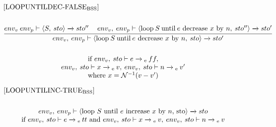 \begin{equation}
\begin{split}
\begin{minipage}{\linewidth}
$[\text{LOOPUNTILDEC-FALSE}_\text{BSS}]$
\end{minipage}
\\\\
\begin{minipage}{\linewidth}
\centering
$\cfrac{env_v \: env_p \vdash \langle S, \: sto \rangle \xrightarrow{} sto'' \quad\: env_v, \: env_p \vdash \langle \text{loop} \: S \: \text{until} \: e \text{ decrease } x \text{ by } n, \: sto'' \rangle \xrightarrow{} sto'}{env_v, \: env_p \vdash \langle \text{loop} \: S \: \text{until} \: e \text{ decrease } x \text{ by } n, \: sto \rangle \xrightarrow{} sto'}$ 
\end{minipage}
\\\\
\begin{minipage}{\linewidth}
\centering
if $env_v, \: sto \vdash e \xrightarrow{}\textsubscript{e} \: ff,$ \\
$env_v, \: sto \vdash x \xrightarrow{}\textsubscript{e} \: v, \: env_v, \: sto \vdash n \xrightarrow{}\textsubscript{e} \: v'$ 
\\ where $x = \mathcal{N}^{-1}(v-v')$
\end{minipage}
\end{split}
\end{equation}


\begin{equation}
\begin{split}
\begin{minipage}{\linewidth}
$[\text{LOOPUNTILINC-TRUE}_\text{BSS}]$
\end{minipage}
\\\\
\begin{minipage}{\linewidth}
\centering
$env_v, \: env_p \vdash \langle $loop $S$ until  $e$ increase $x$ by $n$, sto$\rangle \xrightarrow{} sto$ \\
if $env_v, \: sto \vdash e \xrightarrow{}\textsubscript{e} \: tt$ and $env_v, \: sto \vdash x \xrightarrow{}\textsubscript{e} \: v, \: env_v, \: sto \vdash n \xrightarrow{}\textsubscript{e} \: v$ 
\end{minipage}
\end{split}
\end{equation}

